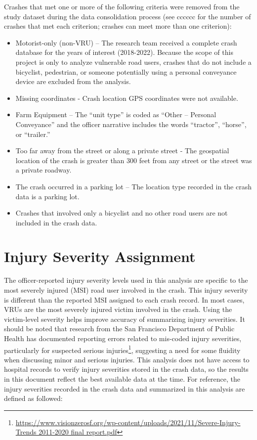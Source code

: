\documentclass[
  letterpaper,
]{scrbook}
\providecommand{\tightlist}{%
  \setlength{\itemsep}{0pt}\setlength{\parskip}{0pt}}\usepackage{longtable,booktabs,array}
\begin{document}
Crashes that met one or more of the following criteria were removed from
the study dataset during the data consolidation process (see cccccc for
the number of crashes that met each criterion; crashes can meet more
than one criterion):

\begin{itemize}
\tightlist
\item
  Motorist-only (non-VRU) -- The research team received a complete crash
  database for the years of interest (2018-2022). Because the scope of
  this project is only to analyze vulnerable road users, crashes that do
  not include a bicyclist, pedestrian, or someone potentially using a
  personal conveyance device are excluded from the analysis.
\item
  Missing coordinates - Crash location GPS coordinates were not
  available.
\item
  Farm Equipment -- The ``unit type'' is coded as ``Other -- Personal
  Conveyance'' and the officer narrative includes the words ``tractor'',
  ``horse'', or ``trailer.''
\item
  Too far away from the street or along a private street - The
  geospatial location of the crash is greater than 300 feet from any
  street or the street was a private roadway.
\item
  The crash occurred in a parking lot -- The location type recorded in
  the crash data is a parking lot.
\item
  Crashes that involved only a bicyclist and no other road users are not
  included in the crash data.
\end{itemize}

\hypertarget{injury-severity-assignment}{%
\section{Injury Severity Assignment}\label{injury-severity-assignment}}

The officer-reported injury severity levels used in this analysis are
specific to the most severely injured (MSI) road user involved in the
crash. This injury severity is different than the reported MSI assigned
to each crash record. In most cases, VRUs are the most severely injured
victim involved in the crash. Using the victim-level severity helps
improve accuracy of summarizing injury severities. It should be noted
that research from the San Francisco Department of Public Health has
documented reporting errors related to mis-coded injury severities,
particularly for suspected serious injuries\footnote{\href{https://www.visionzerosf.org/wp-content/uploads/2021/11/Severe-Injury-Trends\%202011-2020\%20final\%20report.pdf}{https://www.visionzerosf.org/wp-content/uploads/2021/11/Severe-Injury-Trends
  2011-2020 final report.pdf}}, suggesting a need for some fluidity when
discussing minor and serious injuries. This analysis does not have
access to hospital records to verify injury severities stored in the
crash data, so the results in this document reflect the best available
data at the time. For reference, the injury severities recorded in the
crash data and summarized in this analysis are defined as followed:
\end{document}

